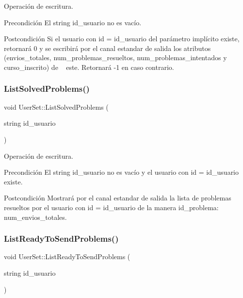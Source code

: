 Operación de escritura. 

\begin{DoxyPrecond}{Precondición}
El string id\+\_\+usuario no es vacío. 
\end{DoxyPrecond}
\begin{DoxyPostcond}{Postcondición}
Si el usuario con id = id\+\_\+usuario del parámetro implícito existe, retornará 0 y se escribirá por el canal estandar de salida los atributos (envios\+\_\+totales, num\+\_\+problemas\+\_\+resueltos, num\+\_\+problemas\+\_\+intentados y curso\+\_\+inscrito) de ~\newline
 este. Retornará -\/1 en caso contrario. 
\end{DoxyPostcond}
\mbox{\label{class_user_set_afa40c2da0d1a67c7d7d6750e4e9cd78d}} 
\subsubsection{\texorpdfstring{List\+Solved\+Problems()}{ListSolvedProblems()}}
{\footnotesize\ttfamily void User\+Set\+::\+List\+Solved\+Problems (\begin{DoxyParamCaption}\item[{string}]{id\+\_\+usuario }\end{DoxyParamCaption})}



Operación de escritura. 

\begin{DoxyPrecond}{Precondición}
El string id\+\_\+usuario no es vacío y el usuario con id = id\+\_\+usuario existe. 
\end{DoxyPrecond}
\begin{DoxyPostcond}{Postcondición}
Mostrará por el canal estandar de salida la lista de problemas resueltos por el usuario con id = id\+\_\+usuario de la manera id\+\_\+problema\+: num\+\_\+envios\+\_\+totales. 
\end{DoxyPostcond}
\mbox{\label{class_user_set_a52e8ebe8033813cf5ad7d8b23d7eea4c}} 
\subsubsection{\texorpdfstring{List\+Ready\+To\+Send\+Problems()}{ListReadyToSendProblems()}}
{\footnotesize\ttfamily void User\+Set\+::\+List\+Ready\+To\+Send\+Problems (\begin{DoxyParamCaption}\item[{string}]{id\+\_\+usuario }\end{DoxyParamCaption})}



